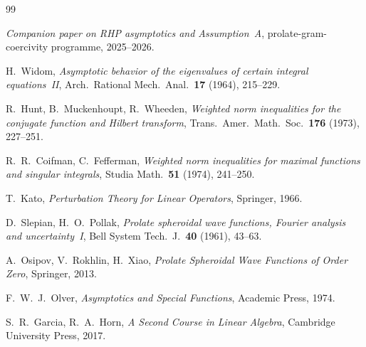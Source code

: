\documentclass[12pt,a4paper]{article}
\begin{document}
\begin{thebibliography}{99}

  \textit{Companion paper on RHP asymptotics and Assumption~A},
  prolate-gram-coercivity programme, 2025--2026.

  H.~Widom,
  \textit{Asymptotic behavior of the eigenvalues of certain integral
  equations~II},
  Arch.\ Rational Mech.\ Anal.\ \textbf{17} (1964), 215--229.

  R.~Hunt, B.~Muckenhoupt, R.~Wheeden,
  \textit{Weighted norm inequalities for the conjugate function
  and Hilbert transform},
  Trans.\ Amer.\ Math.\ Soc.\ \textbf{176} (1973), 227--251.

  R.~R.~Coifman, C.~Fefferman,
  \textit{Weighted norm inequalities for maximal functions and
  singular integrals},
  Studia Math.\ \textbf{51} (1974), 241--250.

  T.~Kato,
  \textit{Perturbation Theory for Linear Operators},
  Springer, 1966.

  D.~Slepian, H.~O.~Pollak,
  \textit{Prolate spheroidal wave functions, Fourier analysis and
  uncertainty~I},
  Bell System Tech.\ J.\ \textbf{40} (1961), 43--63.

  A.~Osipov, V.~Rokhlin, H.~Xiao,
  \textit{Prolate Spheroidal Wave Functions of Order Zero},
  Springer, 2013.

  F.~W.~J.~Olver,
  \textit{Asymptotics and Special Functions},
  Academic Press, 1974.

  S.~R.~Garcia, R.~A.~Horn,
  \textit{A Second Course in Linear Algebra},
  Cambridge University Press, 2017.

\end{thebibliography}
\end{document}
